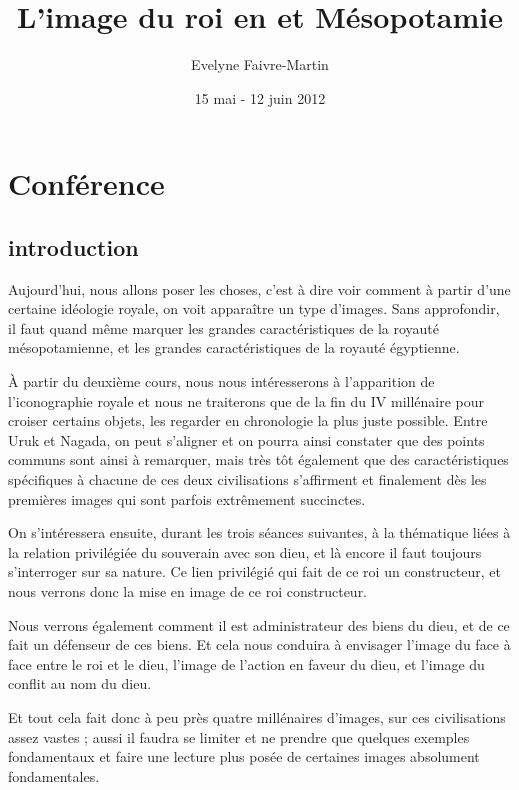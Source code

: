 \documentclass[a4paper]{article}
\title{L’image du roi en \kmt et Mésopotamie}
\author{Evelyne Faivre-Martin}
\date{15 mai - 12 juin 2012}
\begin{document}

\maketitle

\part{Conférence }

\chapter{introduction}


Aujourd'hui, nous allons poser les choses, c'est à dire voir comment 
à partir d'une certaine idéologie royale, on voit apparaître un type 
d'images. Sans approfondir,  il faut quand même marquer les grandes 
caractéristiques de la royauté mésopotamienne, et les grandes 
caractéristiques de la royauté égyptienne.

À partir du deuxième cours, nous nous intéresserons à l'apparition 
de l'iconographie royale et nous ne traiterons que de la fin du IV\ieme 
millénaire pour croiser certains objets, les regarder en chronologie 
la plus juste possible.
Entre Uruk et Nagada, on peut s'aligner et on pourra ainsi constater 
que des points communs sont ainsi à remarquer, mais très tôt également 
que des caractéristiques spécifiques à chacune de ces deux civilisations 
s'affirment et finalement dès les premières images qui sont parfois 
extrêmement succinctes.

On s'intéressera ensuite, durant les trois séances suivantes, à la 
thématique liées à la relation privilégiée du souverain avec son dieu, 
et là encore il faut toujours s'interroger sur sa nature. Ce lien 
privilégié qui fait de ce roi un constructeur, et nous verrons donc la 
mise en image de ce roi constructeur.

Nous verrons également comment il est administrateur des biens du 
dieu, et de ce fait un défenseur de ces biens. Et cela nous conduira 
à envisager l'image du face à face entre le roi et le dieu, l'image 
de l'action en faveur du dieu, et l'image du conflit au nom du dieu.

Et tout cela fait donc à peu près quatre millénaires d'images, sur ces 
civilisations assez vastes ; aussi il faudra se limiter et ne prendre 
que quelques exemples fondamentaux et faire une lecture plus posée de 
certaines images absolument fondamentales.
\end{document}
